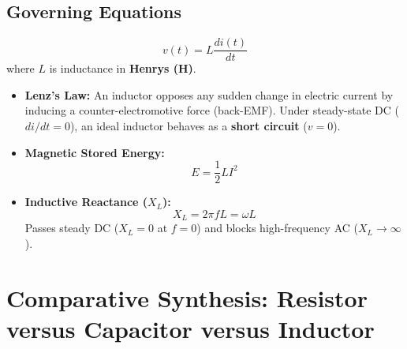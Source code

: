 \subsection{Governing Equations}
\begin{equation}
\label{eq:inductor_iv}
\boxed{v(t) = L \frac{di(t)}{dt}}
\end{equation}
where $L$ is inductance in \textbf{Henrys (H)}.
\begin{itemize}
    \item \textbf{Lenz's Law:} An inductor opposes any sudden change in electric current by inducing a counter-electromotive force (back-EMF). Under steady-state DC ($di/dt = 0$), an ideal inductor behaves as a \textbf{short circuit} ($v = 0$).
    \item \textbf{Magnetic Stored Energy:}
    \begin{equation}
    \label{eq:inductor_energy}
    \boxed{E = \frac{1}{2} L I^2}
    \end{equation}
    \item \textbf{Inductive Reactance ($X_L$):}
    \begin{equation}
    \label{eq:inductive_reactance}
    \boxed{X_L = 2\pi f L = \omega L}
    \end{equation}
    Passes steady DC ($X_L = 0$ at $f = 0$) and blocks high-frequency AC ($X_L \to \infty$).
\end{itemize}


\section{Comparative Synthesis: Resistor versus Capacitor versus Inductor}
\label{sec:rlc_comparison}

